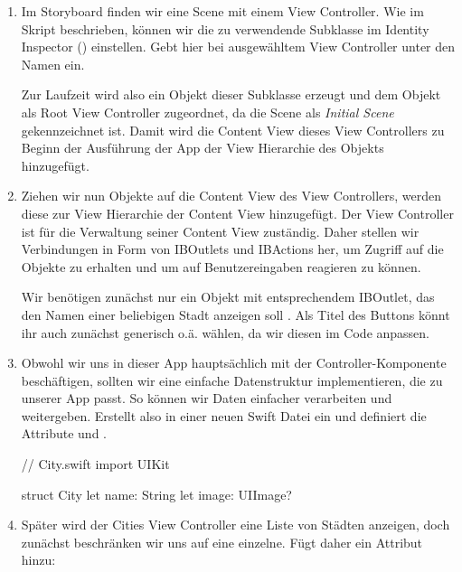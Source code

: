 \documentclass[parskip=half, final]{scrreprt}
\begin{document}
\begin{lecture}
\begin{enumerate}
\item Im Storyboard finden wir eine Scene mit einem View Controller. Wie im Skript beschrieben, können wir die zu verwendende  Subklasse im Identity Inspector () einstellen. Gebt hier bei ausgewähltem View Controller unter  den Namen  ein.

Zur Laufzeit wird also ein Objekt dieser Subklasse erzeugt und dem  Objekt als Root View Controller zugeordnet, da die Scene als \emph{Initial Scene} gekennzeichnet ist. Damit wird die Content View dieses View Controllers zu Beginn der Ausführung der App der View Hierarchie des  Objekts hinzugefügt.

\item Ziehen wir nun  Objekte auf die Content View des View Controllers, werden diese zur View Hierarchie der Content View hinzugefügt. Der View Controller ist für die Verwaltung seiner Content View zuständig. Daher stellen wir Verbindungen in Form von IBOutlets und IBActions her, um Zugriff auf die Objekte zu erhalten und um auf Benutzereingaben reagieren zu können.

Wir benötigen zunächst nur ein  Objekt mit entsprechendem IBOutlet, das den Namen einer beliebigen Stadt anzeigen soll . Als Titel des Buttons könnt ihr auch zunächst generisch  o.ä. wählen, da wir diesen im Code anpassen.


\item Obwohl wir uns in dieser App hauptsächlich mit der Controller-Komponente beschäftigen, sollten wir eine einfache Datenstruktur implementieren, die zu unserer App passt. So können wir Daten einfacher verarbeiten und weitergeben. Erstellt also in einer neuen Swift Datei ein  und definiert die Attribute  und .

\begin{swiftcode}
// City.swift
import UIKit

struct City {
    let name: String
    let image: UIImage?
}
\end{swiftcode}

\item Später wird der Cities View Controller eine Liste von Städten anzeigen, doch zunächst beschränken wir uns auf eine einzelne. Fügt  daher ein Attribut  hinzu:


\end{enumerate}
\end{lecture}
\end{document}
